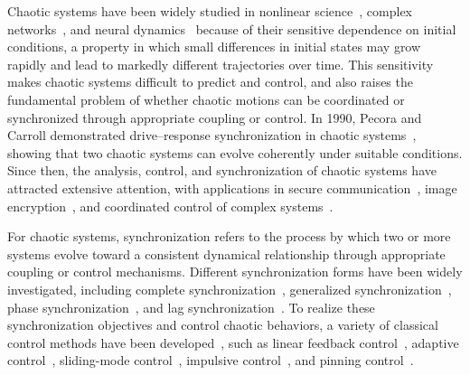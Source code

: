 \documentclass[10pt,twocolumn]{article}
\theoremstyle{definition}
\begin{document}
Chaotic systems have been widely studied in nonlinear science~\cite{strogatz2018nonlinear}, complex networks~\cite{boccaletti2006complex}, and neural dynamics~\cite{izhikevich2007dynamical} because of their sensitive dependence on initial conditions, a property in which small differences in initial states may grow rapidly and lead to markedly different trajectories over time. This sensitivity makes chaotic systems difficult to predict and control, and also raises the fundamental problem of whether chaotic motions can be coordinated or synchronized through appropriate coupling or control. In 1990, Pecora and Carroll demonstrated drive--response synchronization in chaotic systems~\cite{pecora1990synchronization}, showing that two chaotic systems can evolve coherently under suitable conditions. Since then, the analysis, control, and synchronization of chaotic systems have attracted extensive attention, with applications in secure communication~\cite{koronovskii2010on,argyris2005chaos,vanwiggeren1998communication}, image encryption~\cite{zia2022survey,xu2014image}, and coordinated control of complex systems~\cite{wen2021coordination,olfati2007consensus}.

For chaotic systems, synchronization refers to the process by which two or more systems evolve toward a consistent dynamical relationship through appropriate coupling or control mechanisms. Different synchronization forms have been widely investigated, including complete synchronization~\cite{lin2005complete}, generalized synchronization~\cite{kocarev1996generalized}, phase synchronization~\cite{guan2005phase}, and lag synchronization~\cite{rosenblum1997phase}. To realize these synchronization objectives and control chaotic behaviors, a variety of classical control methods have been developed~\cite{ott1990controlling,boccaletti2000control}, such as linear feedback control~\cite{yassen2005controlling}, adaptive control~\cite{wang2003feedback}, sliding-mode control~\cite{feki2009sliding,su2021fixed,mobayen2018chaos}, impulsive control~\cite{li2005impulsive}, and pinning control~\cite{chen2014pinning}.
\end{document}
